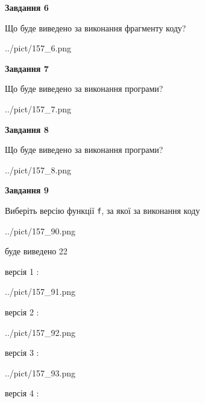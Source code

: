 \documentclass[12pt, ukrainian]{article}
\def\code#1{\Verb!#1!}
\begin{document}
{\begin {large}
{\begin {center}\textbf{Завдання 6}\end {center}}

Що буде виведено за виконання фрагменту коду?\par
\begin{center}
	{../pict/157_6.png}
\end{center}
\newpage

{\begin {center}\textbf{Завдання 7}\end {center}}

Що буде виведено за виконання програми?\par
\begin{center}
	{../pict/157_7.png}
\end{center}
\newpage

{\begin {center}\textbf{Завдання 8}\end {center}}

Що буде виведено за виконання програми?\par
\begin{center}
	{../pict/157_8.png}
\end{center}
\newpage

{\begin {center}\textbf{Завдання 9}\end {center}}

Виберіть версію функції \code{f}, за якої за виконання коду
\begin{center}
	{../pict/157_90.png}
\end{center}
буде виведено 22

\vspace{5mm}
версія 1 :

\begin{center}
	{../pict/157_91.png}
\end{center}
версія 2 :

\begin{center}
	{../pict/157_92.png}
\end{center}
версія 3 :

\begin{center}
	{../pict/157_93.png}
\end{center}
версія 4 :


\end{large}}
\end{document}
